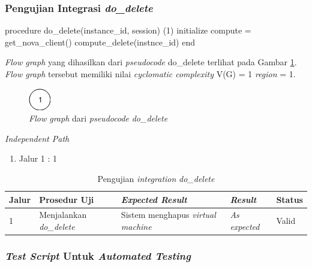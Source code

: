 \subsubsection{Pengujian Integrasi \emph{do\_delete}}

\begin{code}
\begin{ignasicblock}[title=do\_delete,minted language=text]
procedure do_delete(instance_id, session)    (1)
    initialize compute = get_nova_client()
    compute_delete(instnce_id)
end
\end{ignasicblock}
\label{pc:rm_vm}
\end{code}

\par\null\par
\noindent
\emph{Flow graph} yang dihasilkan dari \emph{pseudocode}
do\_delete terlihat pada Gambar \ref{cfg:rm_vm}.
\emph{Flow graph} tersebut memiliki nilai \emph{cyclomatic complexity} V(G) = 1 \emph{region} = 1.

\begin{figure}[H]
  \centering
  \includegraphics[width=.06\linewidth]{img/test-case/1node}
  \caption{\emph{Flow graph} dari \emph{pseudocode} \emph{do\_delete}}
  \label{cfg:rm_vm}
\end{figure}

\noindent
\emph{Independent Path}

\begin{enumerate}
\item Jalur 1 : 1
\end{enumerate}


\begin{longtable}{|P{.06\textwidth}|P{.30\textwidth}|P{.30\textwidth}|P{.10\textwidth}|P{.08\textwidth}|}
  \caption{Pengujian \emph{integration} \emph{do\_delete}} \label{jalur:rm-vm}\\
  \hline
  \textbf{Jalur} & \textbf{Prosedur Uji} & \textbf{\emph{Expected Result}}
  & \textbf{\emph{Result}} & \textbf{Status} \\\hline
  1 & Menjalankan \emph{do\_delete} & Sistem menghapus \emph{virtual machine} & \emph{As expected} & Valid \\\hline
\end{longtable}

\subsubsection{\emph{Test Script} Untuk \emph{Automated Testing}}

